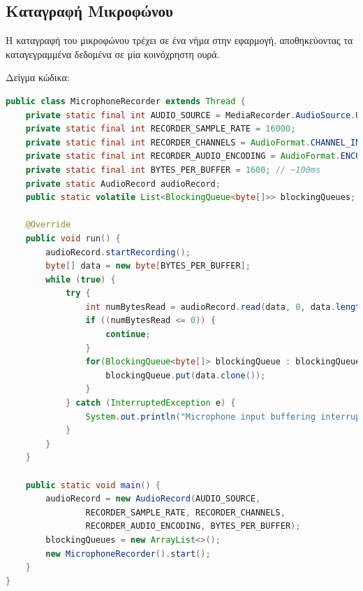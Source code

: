 \documentclass[oneside, 12pt]{book}
\begin{document}
\subsection{Καταγραφή Μικροφώνου}
Η καταγραφή του μικροφώνου τρέχει σε ένα νήμα στην εφαρμογή, αποθηκεύοντας τα καταγεγραμμένα δεδομένα σε μία κοινόχρηστη ουρά.
\begin{center}
	Δείγμα κώδικα:
	\begin{lstlisting}[language=java]
public class MicrophoneRecorder extends Thread {
    private static final int AUDIO_SOURCE = MediaRecorder.AudioSource.UNPROCESSED;
    private static final int RECORDER_SAMPLE_RATE = 16000;
    private static final int RECORDER_CHANNELS = AudioFormat.CHANNEL_IN_MONO;
    private static final int RECORDER_AUDIO_ENCODING = AudioFormat.ENCODING_PCM_16BIT;
    private static final int BYTES_PER_BUFFER = 1600; // ~100ms
    private static AudioRecord audioRecord;
    public static volatile List<BlockingQueue<byte[]>> blockingQueues;

    @Override
    public void run() {
        audioRecord.startRecording();
        byte[] data = new byte[BYTES_PER_BUFFER];
        while (true) {
            try {
                int numBytesRead = audioRecord.read(data, 0, data.length);
                if ((numBytesRead <= 0)) {
                    continue;
                }
                for(BlockingQueue<byte[]> blockingQueue : blockingQueues){
                    blockingQueue.put(data.clone());
                }
            } catch (InterruptedException e) {
                System.out.println("Microphone input buffering interrupted : " + e.getMessage());
            }
        }
    }

    public static void main() {
        audioRecord = new AudioRecord(AUDIO_SOURCE,
                RECORDER_SAMPLE_RATE, RECORDER_CHANNELS,
                RECORDER_AUDIO_ENCODING, BYTES_PER_BUFFER);
        blockingQueues = new ArrayList<>();
        new MicrophoneRecorder().start();
    }
}
	\end{lstlisting}
\end{center}
\end{document}
